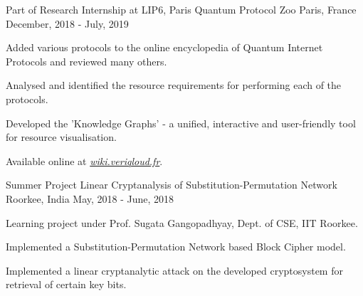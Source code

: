\begin{cventries}
  \cventry
    {Part of Research Internship at LIP6, Paris} %
    {Quantum Protocol Zoo} %
    {Paris, France} %
    {December, 2018 - July, 2019} %
    {
      \begin{cvitems} %
        \item {Added various protocols to the online encyclopedia of Quantum Internet Protocols and reviewed many others.}
        \item {Analysed and identified the resource requirements for performing each of the protocols.}
        \item {Developed the 'Knowledge Graphs' - a unified, interactive and user-friendly tool for resource visualisation.}
        \item {Available online at  \emph{\href{https://wiki.veriqloud.fr}{wiki.veriqloud.fr}}.}
      \end{cvitems}
    }

  \cventry
    {Summer Project} %
    {Linear Cryptanalysis of Substitution-Permutation Network} %
    {Roorkee, India} %
    {May, 2018 - June, 2018} %
    {
      \begin{cvitems} %
        \item {Learning project under Prof. Sugata Gangopadhyay, Dept. of CSE, IIT Roorkee.}
        \item {Implemented a Substitution-Permutation Network based Block Cipher model.}
        \item {Implemented a linear cryptanalytic attack on the developed cryptosystem for retrieval of certain key bits.}
      \end{cvitems}
    }


\end{cventries}

